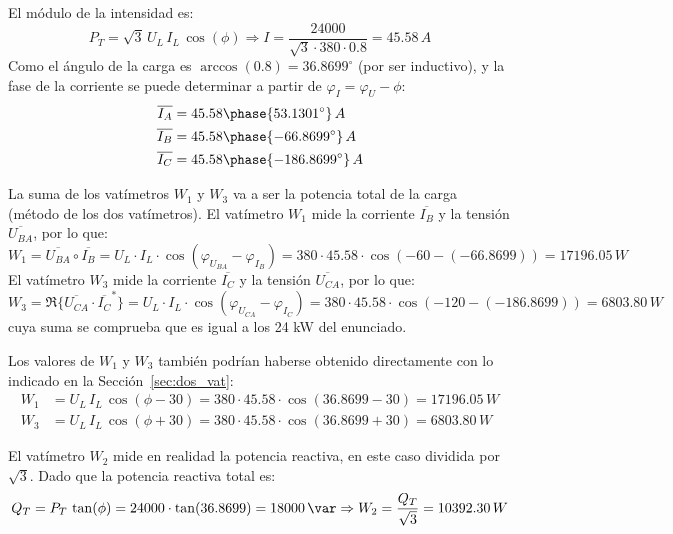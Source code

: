 \begin{example}
El módulo de la intensidad es:
\begin{equation*}
    P_T=\sqrt{3}\,U_L\,I_L\,\cos(\phi)\Rightarrow I=\dfrac{24000}{\sqrt{3}\cdot 380\cdot 0.8}=45.58\,A
\end{equation*}
Como el ángulo de la carga es $\arccos{(0.8)}=36.8699^\circ$ (por ser inductivo), y la fase de la corriente se puede determinar a partir de $\varphi_I=\varphi_U-\phi$:
\begin{align*}
    \overline{I_A}&=45.58\phase{53.1301^\circ}\,A\\
    \overline{I_B}&=45.58\phase{-66.8699^\circ}\,A\\
    \overline{I_C}&=45.58\phase{-186.8699^\circ}\,A
\end{align*}

La suma de los vatímetros $W_1$ y $W_3$ va a ser la potencia total de la carga (método de los dos vatímetros). El vatímetro $W_1$ mide la corriente $\overline{I_B}$ y la tensión $\overline{U_{BA}}$, por lo que: \begin{equation*}
    W_1=\overline{U_{BA}}\circ \overline{I_B}=U_{L}\cdot I_L\cdot \cos{(\varphi_{U_{BA}}-\varphi_{I_B})}= 380\cdot 45.58\cdot \cos(-60-(-66.8699))=17196.05\,W
\end{equation*}
El vatímetro $W_3$ mide la corriente $\overline{I_C}$ y la tensión $\overline{U_{CA}}$, por lo que: \begin{equation*}
    W_3=\Re\{\overline{U_{CA}}\cdot \overline{I_C}^*\}=U_{L}\cdot I_L\cdot \cos{(\varphi_{U_{CA}}-\varphi_{I_C})}= 380\cdot 45.58\cdot \cos(-120-(-186.8699))=6803.80\,W
\end{equation*}
cuya suma se comprueba que es igual a los 24 kW del enunciado.
\begin{remark}
    Los valores de $W_1$ y $W_3$ también podrían haberse obtenido directamente con lo indicado en la Sección~\ref{sec:dos_vat}:
    \begin{align*}
        W_1&=U_L\,I_L\,\cos(\phi-30)=380\cdot 45.58\cdot \cos(36.8699-30)=17196.05\,W\\
        W_3&=U_L\,I_L\,\cos(\phi+30)=380\cdot 45.58\cdot \cos(36.8699+30)=6803.80\,W
    \end{align*}
\end{remark}

El vatímetro $W_2$ mide en realidad la potencia reactiva, en este caso dividida por $\sqrt{3}$. Dado que la potencia reactiva total es:
\begin{equation*}
    Q_T=P_T\,\tan(\phi)=24000\cdot\tan(36.8699)=18000 \,\si{\var}\Rightarrow W_2=\dfrac{Q_T}{\sqrt{3}}=10392.30\,W
\end{equation*}


\end{example}
